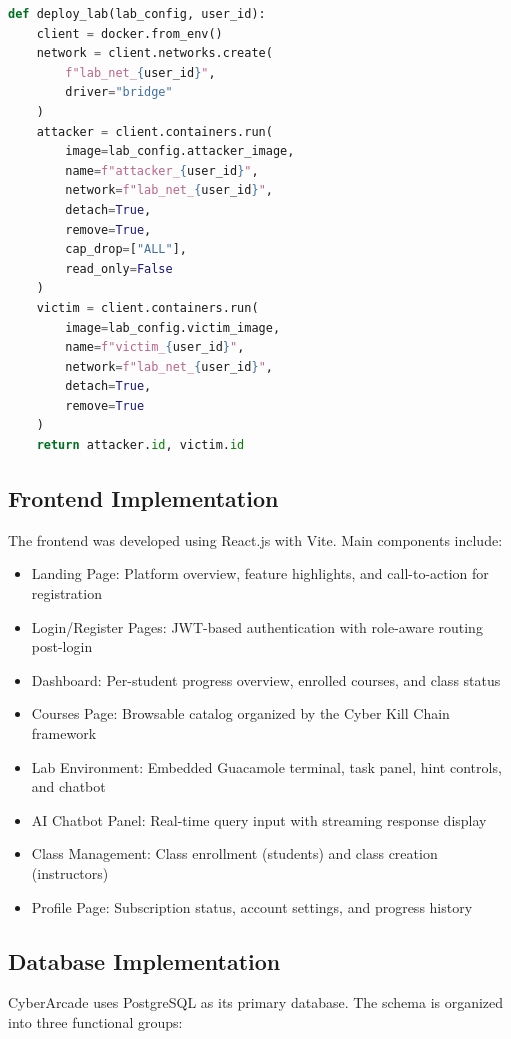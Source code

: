 \documentclass[12pt,a4paper]{report}
\begin{document}
\begin{lstlisting}[language=Python, caption={Sample Backend Code --- Lab Deployment}]
def deploy_lab(lab_config, user_id):
    client = docker.from_env()
    network = client.networks.create(
        f"lab_net_{user_id}",
        driver="bridge"
    )
    attacker = client.containers.run(
        image=lab_config.attacker_image,
        name=f"attacker_{user_id}",
        network=f"lab_net_{user_id}",
        detach=True,
        remove=True,
        cap_drop=["ALL"],
        read_only=False
    )
    victim = client.containers.run(
        image=lab_config.victim_image,
        name=f"victim_{user_id}",
        network=f"lab_net_{user_id}",
        detach=True,
        remove=True
    )
    return attacker.id, victim.id
\end{lstlisting}

\subsection{Frontend Implementation}

The frontend was developed using React.js with Vite. Main components include:
\begin{itemize}
  \item Landing Page: Platform overview, feature highlights, and call-to-action for registration
  \item Login/Register Pages: JWT-based authentication with role-aware routing post-login
  \item Dashboard: Per-student progress overview, enrolled courses, and class status
  \item Courses Page: Browsable catalog organized by the Cyber Kill Chain framework
  \item Lab Environment: Embedded Guacamole terminal, task panel, hint controls, and chatbot
  \item AI Chatbot Panel: Real-time query input with streaming response display
  \item Class Management: Class enrollment (students) and class creation (instructors)
  \item Profile Page: Subscription status, account settings, and progress history
\end{itemize}

\subsection{Database Implementation}

CyberArcade uses PostgreSQL as its primary database. The schema is organized into three functional
groups:
\end{document}
